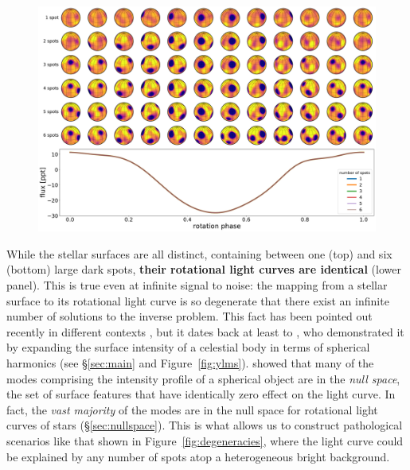 \documentclass[modern]{aastex62}
\begin{document}
\begin{figure}[t!]
    \begin{centering}
        \includegraphics[width=\linewidth]{figures/degeneracies.pdf}
    \end{centering}
\end{figure}

While the stellar surfaces are all distinct, containing between one (top)
and six (bottom) large dark spots,
\textbf{their rotational light curves are identical}
(lower panel). This is true even at infinite signal to
noise: the mapping from a stellar surface
to its rotational light curve is so degenerate that there exist an infinite number of solutions
to the inverse problem. This fact has been pointed out recently in different contexts
\citep[e.g.,][]{Cowan2013,Luger2019,Basri2020}, but it dates back at least to
\citet{Russell1906}, who demonstrated it by expanding the surface
intensity of a celestial body in terms of spherical harmonics
(see \S\ref{sec:main} and Figure~\ref{fig:ylms}). \citet{Russell1906} showed
that many of the modes comprising the intensity profile of a spherical
object are in the \emph{null space}, the set of surface features that have identically
zero effect on the light curve. In fact,
the \emph{vast majority} of the modes are in the null space for rotational
light curves of stars (\S\ref{sec:nullspace}). This is what allows us to construct pathological
scenarios like that shown in Figure~\ref{fig:degeneracies}, where the light curve
could be explained by any number of spots atop a heterogeneous bright background.
\end{document}

